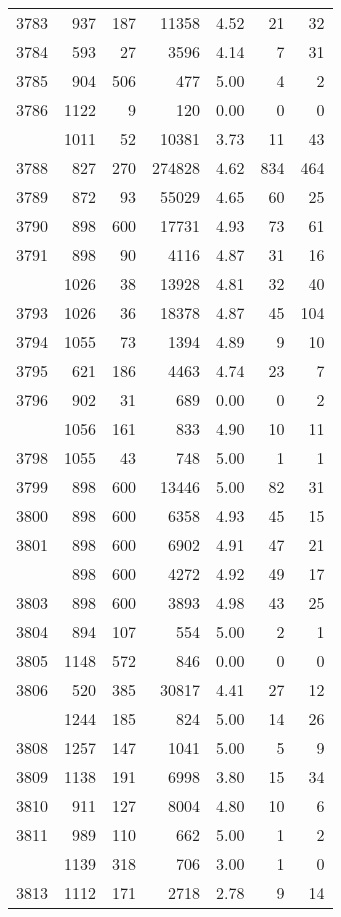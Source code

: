 \documentclass[
]{article}
\begin{document}
\begin{table}
\begin{tabular}[t]{lrrrrrr}
3783 & 937 & 187 & 11358 & 4.52 & 21 & 32\\
3784 & 593 & 27 & 3596 & 4.14 & 7 & 31\\
3785 & 904 & 506 & 477 & 5.00 & 4 & 2\\
3786 & 1122 & 9 & 120 & 0.00 & 0 & 0\\
\addlinespace
3787 & 1011 & 52 & 10381 & 3.73 & 11 & 43\\
3788 & 827 & 270 & 274828 & 4.62 & 834 & 464\\
3789 & 872 & 93 & 55029 & 4.65 & 60 & 25\\
3790 & 898 & 600 & 17731 & 4.93 & 73 & 61\\
3791 & 898 & 90 & 4116 & 4.87 & 31 & 16\\
\addlinespace
3792 & 1026 & 38 & 13928 & 4.81 & 32 & 40\\
3793 & 1026 & 36 & 18378 & 4.87 & 45 & 104\\
3794 & 1055 & 73 & 1394 & 4.89 & 9 & 10\\
3795 & 621 & 186 & 4463 & 4.74 & 23 & 7\\
3796 & 902 & 31 & 689 & 0.00 & 0 & 2\\
\addlinespace
3797 & 1056 & 161 & 833 & 4.90 & 10 & 11\\
3798 & 1055 & 43 & 748 & 5.00 & 1 & 1\\
3799 & 898 & 600 & 13446 & 5.00 & 82 & 31\\
3800 & 898 & 600 & 6358 & 4.93 & 45 & 15\\
3801 & 898 & 600 & 6902 & 4.91 & 47 & 21\\
\addlinespace
3802 & 898 & 600 & 4272 & 4.92 & 49 & 17\\
3803 & 898 & 600 & 3893 & 4.98 & 43 & 25\\
3804 & 894 & 107 & 554 & 5.00 & 2 & 1\\
3805 & 1148 & 572 & 846 & 0.00 & 0 & 0\\
3806 & 520 & 385 & 30817 & 4.41 & 27 & 12\\
\addlinespace
3807 & 1244 & 185 & 824 & 5.00 & 14 & 26\\
3808 & 1257 & 147 & 1041 & 5.00 & 5 & 9\\
3809 & 1138 & 191 & 6998 & 3.80 & 15 & 34\\
3810 & 911 & 127 & 8004 & 4.80 & 10 & 6\\
3811 & 989 & 110 & 662 & 5.00 & 1 & 2\\
\addlinespace
3812 & 1139 & 318 & 706 & 3.00 & 1 & 0\\
3813 & 1112 & 171 & 2718 & 2.78 & 9 & 14\\

\end{tabular}
\end{table}
\end{document}
